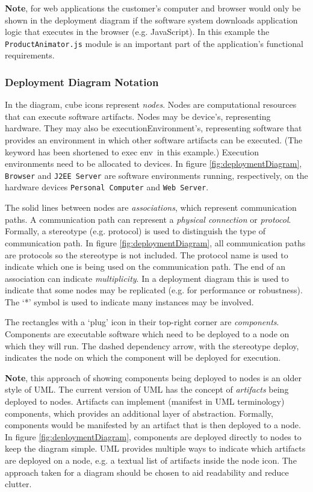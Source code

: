 \noindent
\textbf{Note}, for web applications the customer's computer and browser would only be shown in the deployment diagram
if the software system downloads application logic that executes in the browser (e.g. JavaScript).
In this example the \texttt{ProductAnimator.js} module is an important part of the application's functional requirements.

\subsubsection{Deployment Diagram Notation}\label{sec:deploymentNotation}
In the diagram, cube icons represent \emph{nodes}. Nodes are computational resources that can execute software artifacts.
Nodes may be \guillemotleft device\guillemotright's, representing hardware.
They may also be \guillemotleft executionEnvironment\guillemotright's, representing software that provides an environment in which other software artifacts can be executed.
(The keyword has been shortened to \guillemotleft exec env\guillemotright~in this example.)
Execution environments need to be allocated to devices.
In figure \ref{fig:deploymentDiagram}, \texttt{Browser} and \texttt{J2EE Server} are software environments running,
respectively, on the hardware devices \texttt{Personal Computer} and \texttt{Web Server}.

The solid lines between nodes are \emph{associations}, which represent communication paths.
A communication path can represent a \emph{physical connection} or \emph{protocol}.
Formally, a stereotype (e.g. \guillemotleft protocol\guillemotright) is used to distinguish the type of communication path.
In figure \ref{fig:deploymentDiagram}, all communication paths are protocols so the stereotype is not included.
The protocol name is used to indicate which one is being used on the communication path.
The end of an association can indicate \emph{multiplicity}.
In a deployment diagram this is used to indicate that some nodes may be replicated
(e.g. for performance or robustness). The `*' symbol is used to indicate many instances may be involved.

The rectangles with a `plug' icon in their top-right corner are \emph{components}.
Components are executable software which need to be deployed to a node on which they will run.
The dashed dependency arrow, with the stereotype \guillemotleft deploy\guillemotright, indicates the node on which the component will be deployed for execution.

\textbf{Note}, this approach of showing components being deployed to nodes is an older style of UML.
The current version of UML has the concept of \emph{artifacts} being deployed to nodes.
Artifacts can implement (manifest in UML terminology) components, which provides an additional layer of abstraction.
Formally, components would be manifested by an artifact that is then deployed to a node.
In figure \ref{fig:deploymentDiagram}, components are deployed directly to nodes to keep the diagram simple.
UML provides multiple ways to indicate which artifacts are deployed on a node, e.g. a textual list of artifacts inside the node icon.
The approach taken for a diagram should be chosen to aid readability and reduce clutter.

